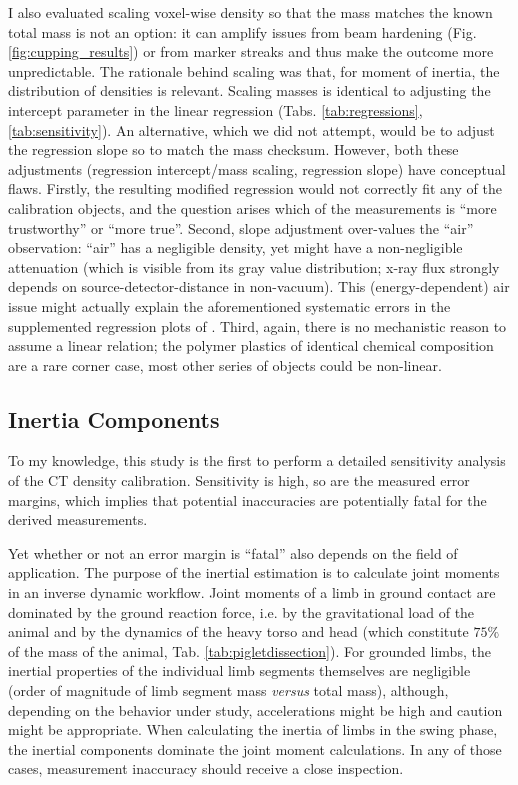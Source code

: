 I also evaluated scaling voxel-wise density so that the mass matches the known total mass is not an option: it can amplify issues from beam hardening (Fig. \ref{fig:cupping_results}) or from marker streaks and thus make the outcome more unpredictable.
The rationale behind scaling was that, for moment of inertia, the distribution of densities is relevant.
Scaling masses is identical to adjusting the intercept parameter in the linear regression (Tabs. \ref{tab:regressions}, \ref{tab:sensitivity}).
An alternative, which we did not attempt, would be to adjust the regression slope so to match the mass checksum.
However, both these adjustments (regression intercept/mass scaling, regression slope) have conceptual flaws.
Firstly, the resulting modified regression would not correctly fit any of the calibration objects, and the question arises which of the measurements is ``more trustworthy'' or ``more true''.
Second, slope adjustment over-values the ``air'' observation: ``air'' has a negligible density, yet might have a non-negligible attenuation (which is visible from its gray value distribution; x-ray flux strongly depends on source-detector-distance in non-vacuum).
This (energy-dependent) air issue might actually explain the aforementioned systematic errors in the supplemented regression plots of \citet{Durston2022}.
Third, again, there is no mechanistic reason to assume a linear relation; the polymer plastics of identical chemical composition are a rare corner case, most other series of objects could be non-linear.


\subsection{Inertia Components}
\label{sec:org51b78c8}
To my knowledge, this study is the first to perform a detailed sensitivity analysis of the CT density calibration.
Sensitivity is high, so are the measured error margins, which implies that potential inaccuracies are potentially fatal for the derived measurements.

Yet whether or not an error margin is ``fatal'' also depends on the field of application.
The purpose of the inertial estimation is to calculate joint moments in an inverse dynamic workflow.
Joint moments of a limb in ground contact are dominated by the ground reaction force, i.e. by the gravitational load of the animal and by the dynamics of the heavy torso and head (which constitute \(75 \%\) of the mass of the animal, Tab. \ref{tab:pigletdissection}).
For grounded limbs, the inertial properties of the individual limb segments themselves are negligible (order of magnitude of limb segment mass \emph{versus} total mass), although, depending on the behavior under study, accelerations might be high and caution might be appropriate.
When calculating the inertia of limbs in the swing phase, the inertial components dominate the joint moment calculations.
In any of those cases, measurement inaccuracy should receive a close inspection.



